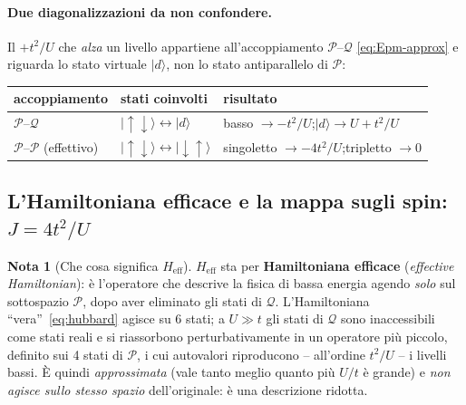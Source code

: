 \documentclass[11pt,a4paper]{article}
\newcommand{\ket}[1]{\lvert #1 \rangle}
\newcommand{\up}{\uparrow}
\newcommand{\dn}{\downarrow}
\newcommand{\Heff}{H_{\mathrm{eff}}}
\theoremstyle{definition}
\newtheorem*{nota}{Nota}
\theoremstyle{remark}
\begin{document}
\paragraph{Due diagonalizzazioni da non confondere.} Il $+t^2/U$ che \emph{alza} un livello appartiene
all'accoppiamento $\mathcal P$--$\mathcal Q$ \eqref{eq:Epm-approx} e riguarda lo stato virtuale $\ket{d}$,
non lo stato antiparallelo di $\mathcal P$:
\begin{center}
\begin{tabular}{lll}
\toprule
accoppiamento & stati coinvolti & risultato \\
\midrule
$\mathcal P$--$\mathcal Q$ & $\ket{\up\dn}\leftrightarrow\ket{d}$ & basso $\to -t^2/U$;\quad $\ket{d}\to U+t^2/U$ \\
$\mathcal P$--$\mathcal P$ (effettivo) & $\ket{\up\dn}\leftrightarrow\ket{\dn\up}$ & singoletto $\to -4t^2/U$;\quad tripletto $\to 0$ \\
\bottomrule
\end{tabular}
\end{center}

\FloatBarrier
\subsection{L'Hamiltoniana efficace e la mappa sugli spin: $J=4t^2/U$}
\label{sub:efficace}

\begin{nota}[Che cosa significa $\Heff$]
$\Heff$ sta per \textbf{Hamiltoniana efficace} (\emph{effective Hamiltonian}): è l'operatore che descrive
la fisica di bassa energia agendo \emph{solo} sul sottospazio $\mathcal P$, dopo aver eliminato gli stati
di $\mathcal Q$. L'Hamiltoniana ``vera''~\eqref{eq:hubbard} agisce su 6 stati; a $U\gg t$ gli stati di
$\mathcal Q$ sono inaccessibili come stati reali e si riassorbono perturbativamente in un operatore più
piccolo, definito sui 4 stati di $\mathcal P$, i cui autovalori riproducono -- all'ordine $t^2/U$ -- i
livelli bassi. È quindi \emph{approssimata} (vale tanto meglio quanto più $U/t$ è grande) e \emph{non
agisce sullo stesso spazio} dell'originale: è una descrizione ridotta.
\end{nota}
\end{document}
